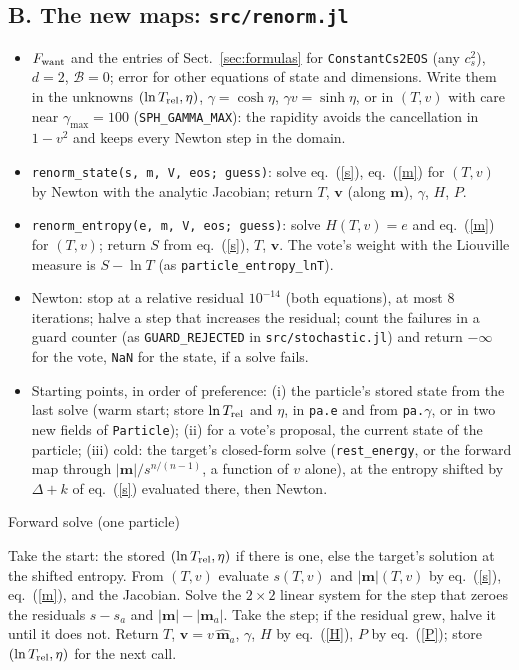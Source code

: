 \documentclass[11pt,aps,preprint,nofootinbib,superscriptaddress,tightenlines]{revtex4-2}
\newcommand{\klab}{\mathcal B}
\def\Eq#1{eq.~(\ref{#1})}
\def\Sect#1{Sect.~\ref{#1}}
\begin{document}
\subsection{B. The new maps: \texorpdfstring{\nolinkurl{src/renorm.jl}}{src/renorm.jl}}
\label{sec:renormjl}

\begin{itemize}
\item $F_{\rm want}$ and the entries of \Sect{sec:formulas} for \texttt{ConstantCs2EOS} (any $c_s^2$), $d=2$, $\klab=0$; error for other equations of state and
  dimensions.  Write them in the unknowns $(\ln T_{\rm rel},\eta)$, $\gamma=\cosh\eta$, $\gamma v=\sinh\eta$, or in $(T,v)$ with care near $\gamma_{\max}=100$
  (\texttt{SPH\_GAMMA\_MAX}): the rapidity avoids the cancellation in $1-v^2$ and keeps every Newton step in the domain.
\item \texttt{renorm\_state(s, m, V, eos; guess)}: solve \Eq{s}, \Eq{m} for $(T,v)$ by Newton with the analytic Jacobian; return $T$, $\bm v$ (along $\bm m$),
  $\gamma$, $H$, $P$.
\item \texttt{renorm\_entropy(e, m, V, eos; guess)}: solve $H(T,v)=e$ and \Eq{m} for $(T,v)$; return $S$ from \Eq{s}, $T$, $\bm v$.  The vote's weight with the
  Liouville measure is $S-\ln T$ (as \texttt{particle\_entropy\_lnT}).
\item Newton: stop at a relative residual $10^{-14}$ (both equations), at most 8 iterations; halve a step that increases the residual; count the failures in a
  guard counter (as \texttt{GUARD\_REJECTED} in \nolinkurl{src/stochastic.jl}) and return $-\infty$ for the vote, \texttt{NaN} for the state, if a solve fails.
\item Starting points, in order of preference: (i) the particle's stored state from the last solve (warm start; store $\ln T_{\rm rel}$ and $\eta$, in
  \texttt{pa.e} and from \texttt{pa.}$\gamma$, or in two new fields of \texttt{Particle}); (ii) for a vote's proposal, the current state of the particle;
  (iii) cold: the target's closed-form solve (\texttt{rest\_energy}, or the forward map through $|\bm m|/s^{n/(n-1)}$, a function of $v$ alone), at the entropy
  shifted by $\Delta+k$ of \Eq{s} evaluated there, then Newton.
\end{itemize}

\begin{algobox}{Forward solve (one particle)}
\begin{algorithmic}[1]
\State Take the start: the stored $(\ln T_{\rm rel},\eta)$ if there is one, else the target's solution at the shifted entropy.
\Repeat
  \State From $(T,v)$ evaluate $s(T,v)$ and $|\bm m|(T,v)$ by \Eq{s}, \Eq{m}, and the Jacobian.
  \State Solve the $2\times2$ linear system for the step that zeroes the residuals $s-s_a$ and $|\bm m|-|\bm m_a|$.
  \State Take the step; if the residual grew, halve it until it does not.
\State Return $T$, $\bm v=v\,\hat{\bm m}_a$, $\gamma$, $H$ by \Eq{H}, $P$ by \Eq{P}; store $(\ln T_{\rm rel},\eta)$ for the next call.
\end{algorithmic}
\end{algobox}
\end{document}
